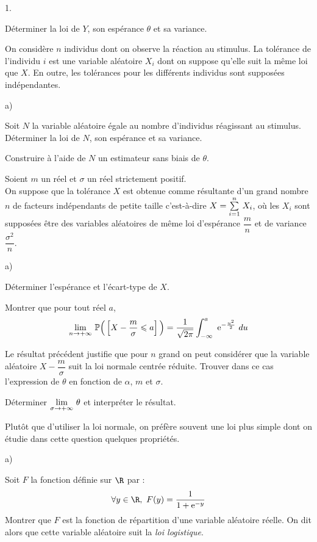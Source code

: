\documentclass[11pt]{article}%
\begin{document}
\begin{noliste}{1.} 
 \item Déterminer la loi de $Y$, son espérance $\theta$ et 
 sa variance.
 
 \item  On considère $n$ individus dont on observe la réaction 
 au stimulus. La tolérance de l'individu $i$ est une variable 
 aléatoire $X_i$ dont on suppose qu'elle suit la  même loi que $X$. 
 En outre, les tolérances pour les différents individus  sont 
 supposées indépendantes.
 \begin{noliste}{a)}
  \item Soit $N$ la variable aléatoire égale au nombre 
  d'individus réagissant au stimulus. Déterminer la loi de $N$, son 
  espérance et sa variance.
  
  \item Construire à l'aide de $N$ un estimateur sans biais de 
  $\theta$.
 \end{noliste}
 
 \item Soient $m$ un réel et $\sigma$ un réel strictement 
 positif.\\
 \noindent
 On suppose que la tolérance $X$ est obtenue comme résultante d'un 
 \og grand nombre \fg{} $n$ de facteurs indépendants de petite taille 
 c'est-à-dire  $X = {\textstyle\sum\limits_{i=1}^{n}}\hspace{.1cm} X_i$, où les $X_i$ sont 
 supposées être des variables aléatoires de même loi 
 d'espérance $\dfrac{m}{n}$ et de variance $\dfrac{\sigma^2}{n}$.
 \begin{noliste}{a)}
  \item Déterminer l'espérance et l'écart-type de $X$.
  
  \item Montrer que pour tout réel $a$, 
  \[
   \dlim{n\to +\infty}\Prob\Big(\Ev{X- \dfrac{m}{\sigma}\leq a}\Big) 
   = \dfrac{1}{\sqrt{2\pi}} \dint{-\infty}{a} \ee^{-\frac{u^2}{2}} \ du
  \]
  
  \item Le résultat précédent justifie que pour $n$ grand on 
  peut considérer que la variable aléatoire  $X- \dfrac{m}{\sigma}$ 
  suit la loi normale centrée réduite.  Trouver dans ce cas 
  l'expression de $\theta$ en fonction de $\alpha $, $m$ et $\sigma$.
  
  \item Déterminer ${\displaystyle \lim_{\sigma \to +\infty} \ } \theta$ et interpréter le 
  résultat.
 \end{noliste}
 
 \item Plutôt que d'utiliser la loi normale, on préfère 
 souvent une loi plus simple dont on étudie dans cette question 
 quelques propriétés.
 \begin{noliste}{a)}
  \item Soit $F$ la fonction définie sur $\R$ par : 
  \[
   \forall y\in \R, \ F(y)= \dfrac{1}{1+\ee^{-y}}
  \]
  Montrer que $F$ est la fonction de répartition d'une variable 
  aléatoire réelle. On dit alors que cette variable aléatoire suit la 
  {\it loi logistique}.
  

\end{noliste}
\end{noliste}
\end{document}
